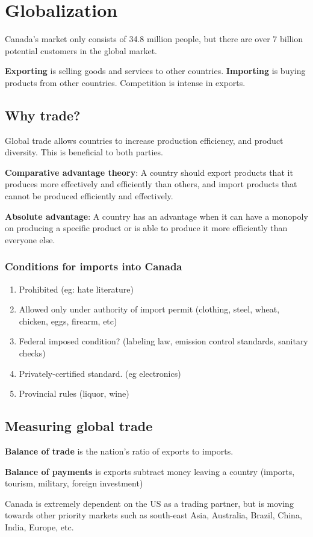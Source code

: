 \documentclass[english, 12pt]{article}
\begin{document}
\notesheader

\section{Globalization}
Canada's market only consists of 34.8 million people, but there are over 7 billion potential customers in the global market.
\begin{defn}
\textbf{Exporting} is selling goods and services to other countries. \textbf{Importing} is buying products from other countries. Competition is intense in exports.
\end{defn}
\subsection{Why trade?}
Global trade allows countries to increase production efficiency, and product diversity. This is beneficial to both parties.
\begin{defn}
\textbf{Comparative advantage theory}: A country should export products that it produces more effectively and efficiently than others, and import products that cannot be produced efficiently and effectively.
\end{defn}
\begin{defn}
\textbf{Absolute advantage}: A country has an advantage when it can have a monopoly on producing a specific product or is able to produce it more efficiently than everyone else.
\end{defn}
\subsubsection*{Conditions for imports into Canada}
\begin{enumerate}
\item Prohibited (eg: hate literature)
\item Allowed only under authority of import permit (clothing, steel, wheat, chicken, eggs, firearm, etc)
\item Federal imposed condition? (labeling law, emission control standards, sanitary checks)
\item Privately-certified standard. (eg electronics)
\item Provincial rules (liquor, wine)
\end{enumerate}
\subsection{Measuring global trade}
\begin{defn}
\textbf{Balance of trade} is the nation's ratio of exports to imports.
\end{defn}
\begin{defn}
\textbf{Balance of payments} is exports subtract money leaving a country (imports, tourism, military, foreign investment)
\end{defn}
Canada is extremely dependent on the US as a trading partner, but is moving towards other priority markets such as south-east Asia, Australia, Brazil, China, India, Europe, etc.
\end{document}
